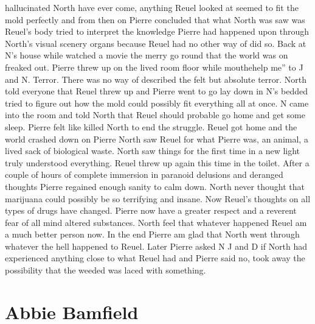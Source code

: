 \documentclass[12pt]{book}
\begin{document}
hallucinated North have ever come, anything Reuel looked at seemed to fit the mold perfectly and from then on Pierre concluded that what North was saw was Reuel's body tried to interpret the knowledge Pierre had happened upon through North's visual scenery organs because Reuel had no other way of did so. Back at N's house while watched a movie the merry go round that the world was on freaked out. Pierre threw up on the lived room floor while mouthehelp me'' to J and N. Terror. There was no way of described the felt but absolute terror. North told everyone that Reuel threw up and Pierre went to go lay down in N's bedded tried to figure out how the mold could possibly fit everything all at once. N came into the room and told North that Reuel should probable go home and get some sleep. Pierre felt like killed North to end the struggle. Reuel got home and the world crashed down on Pierre North saw Reuel for what Pierre was, an animal, a lived sack of biological waste. North saw things for the first time in a new light truly understood everything. Reuel threw up again this time in the toilet. After a couple of hours of complete immersion in paranoid delusions and deranged thoughts Pierre regained enough sanity to calm down. North never thought that marijuana could possibly be so terrifying and insane. Now Reuel's thoughts on all types of drugs have changed. Pierre now have a greater respect and a reverent fear of all mind altered substances. North feel that whatever happened Reuel am a much better person now. In the end Pierre am glad that North went through whatever the hell happened to Reuel. Later Pierre asked N J and D if North had experienced anything close to what Reuel had and Pierre said no, took away the possibility that the weeded was laced with something.



\chapter{Abbie Bamfield}
\end{document}
